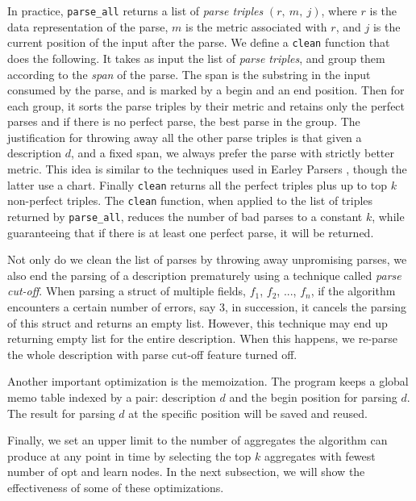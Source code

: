 In practice, {\tt parse\_all} returns a list of
{\em parse triples} $(r,~m,~j)$, where $r$ is the data representation of
the parse, $m$ is the metric associated with $r$, and
$j$ is the current position of the input after the parse.
We define a {\tt clean} function that does the following.
It takes as input the list of {\em parse triples}, and group
them according to the {\em span} of the parse. The span is
the substring in the input consumed by the parse,
and is marked by a begin and an end position.
Then for each group, it sorts the parse triples by
their metric and retains only the perfect parses and if there
is no perfect parse, the best parse in the group. 
The justification for throwing away all the other parse triples
is that given a description $d$, and a fixed span, we always
prefer the parse with strictly better metric. This idea is
similar to the techniques used in Earley Parsers \cite{earley-parser}, 
though the latter use a chart. Finally {\tt clean} returns all
the perfect triples plus up to top $k$ non-perfect triples.
The {\tt clean} function, when applied to the list of triples
returned by {\tt parse\_all},  reduces the number of bad parses 
to a constant $k$, while guaranteeing that if there is at least one
perfect parse, it will be returned. 

Not only do we clean the list of parses by throwing away
unpromising parses, we also end the parsing of a description
prematurely using a technique called {\em parse cut-off}.
When parsing a struct of multiple
fields, $f_1$, $f_2$, ..., $f_n$, if the algorithm encounters 
a certain number of errors, say 3, in succession, it cancels the
parsing of this struct and returns an empty list. However,
this technique may end up returning empty list for
the entire description. When this happens, we re-parse the whole
description with parse cut-off feature turned off. 

Another important optimization is the memoization.
The program keeps a global memo table indexed by a pair:
description $d$ and the begin position for parsing $d$.
The result for parsing $d$ at the specific position
will be saved and reused. 

Finally, we set an upper limit to the number of aggregates the
algorithm can produce at any point in time by selecting the top
$k$ aggregates with fewest number of opt and learn nodes.
In the next subsection, we will show the effectiveness 
of some of these optimizations.

